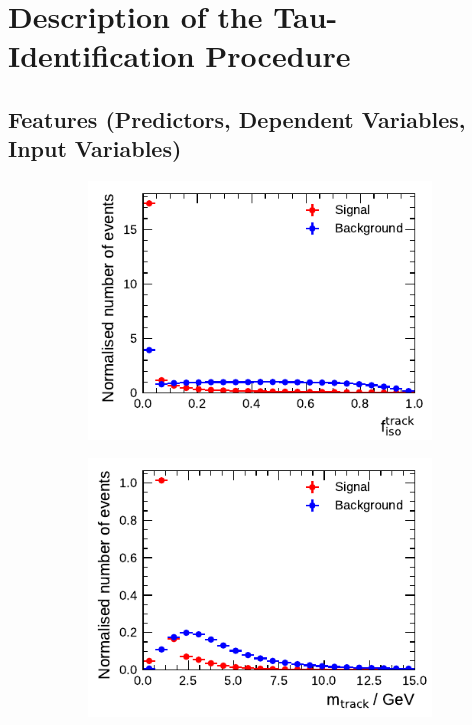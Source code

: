 \section{Description of the Tau-Identification Procedure}
\label{sec:bdt_tauid}

\subsection{Features (Predictors, Dependent Variables, Input Variables)}
\label{sec:bdt_features}

\begin{figure}[ht]
  \begin{subfigure}[t]{0.48\textwidth}
    \centering
    \includegraphics{./figures/baseline_bdt_vars/1p/SumPtTrkFrac.pdf}
  \end{subfigure}\hfill
  \begin{subfigure}[t]{0.48\textwidth}
    \centering
    \includegraphics{./figures/baseline_bdt_vars/3p/massTrkSys.pdf}
  \end{subfigure}
  \caption{}
  \label{fig:bdt_discriminants}
\end{figure}

